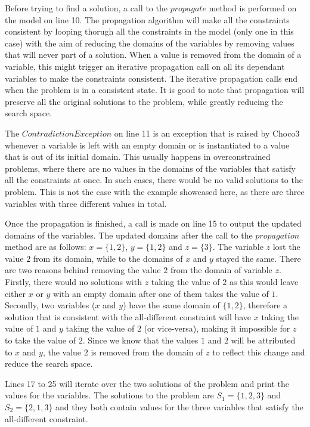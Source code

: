 \documentclass{l4proj}
\begin{document}
\noindent Before trying to find a solution, a call to the $propagate$ method is performed on the model on line 10. The propagation algorithm will make all the constraints consistent by looping thorugh all the constraints in the model (only one in this case) with the aim of reducing the domains of the variables by removing values that will never part of a solution. When a value is removed from the domain of a variable, this might trigger an iterative propagation call on all its dependant variables to make the constraints consistent. The iterative propagation calls end when the problem is in a consistent state. It is good to note that propagation will preserve all the original solutions to the problem, while greatly reducing the search space.

\noindent The $ContradictionException$ on line 11 is an exception that is raised by Choco3 whenever a variable is left with an empty domain or is instantiated to a value that is out of its initial domain. This usually happens in overconstrained problems, where there are no values in the domains of the variables that satisfy all the constraints at once. In such cases, there would be no valid solutions to the problem. This is not the case with the example showcased here, as there are three variables with three different values in total.

\noindent Once the propagation is finished, a call is made on line 15 to output the updated domains of the variables. The updated domains after the call to the $propagation$ method are as follows: $x = \{1, 2\}$, $y = \{1, 2\}$ and $z = \{3\}$. The variable $z$ lost the value $2$ from its domain, while to the domains of $x$ and $y$ stayed the same. There are two reasons behind removing the value $2$ from the domain of variable $z$. Firstly, there would no solutions with $z$ taking the value of $2$ as this would leave either $x$ or $y$ with an empty domain after one of them takes the value of $1$. Secondly, two variables ($x$ and $y$) have the same domain of $\{1, 2\}$, therefore a solution that is consistent with the all-different constraint will have $x$ taking the value of $1$ and $y$ taking the value of $2$ (or vice-versa), making it impossible for $z$ to take the value of $2$.  Since we know that the values $1$ and $2$ will be attributed to $x$ and $y$, the value $2$ is removed from the domain of $z$ to reflect this change and reduce the search space.

\noindent Lines 17 to 25 will iterate over the two solutions of the problem and print the values for the variables. The solutions to the problem are $S_1 = \{1, 2, 3\}$ and $S_2 = \{2, 1, 3\}$ and they both contain values for the three variables that satisfy the all-different constraint.
\end{document}
